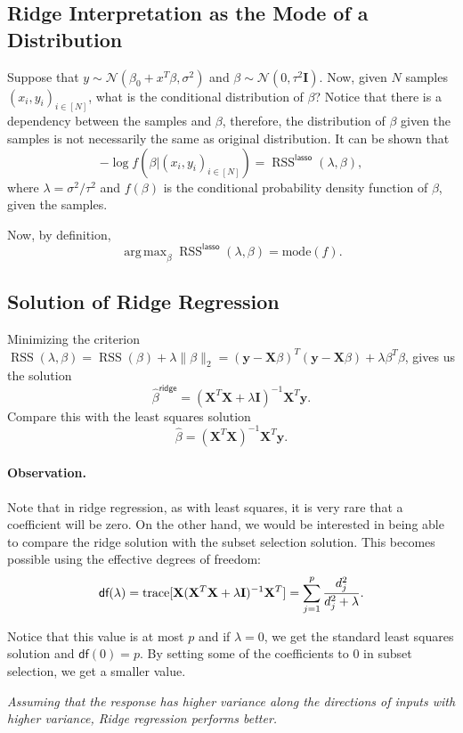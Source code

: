 \documentclass[11pt]{article}
\theoremstyle{definition}
\newcommand{\XX}{\mathbf{X}}
\newcommand{\yy}{\mathbf{y}}
\newcommand{\II}{\mathbf{I}}
\newcommand{\ridge}{\textsf{ridge}}
\newcommand{\lasso}{\textsf{lasso}}
\newcommand{\df}{\textsf{df}}
\newcommand{\Normal}[2]{\ensuremath{\mathcal N (#1, #2)}}
\DeclareMathOperator*{\argmax}{arg\,max}
\DeclareMathOperator*{\RSS}{RSS} \DeclareMathOperator*{\WRSS}{WRSS}
\begin{document}
\subsection{Ridge Interpretation as the Mode of a Distribution}
Suppose that $y\sim \Normal{\beta_0+x^T\beta}{\sigma^2}$ and
$\beta\sim\Normal{0}{\tau^2 \II}$. Now, given $N$ samples $(x_i,y_i)_{i\in[N]}$,
what is the conditional distribution of $\beta$? Notice that there is a
dependency between the samples and $\beta$, therefore, the distribution of
$\beta$ given the samples is not necessarily the same as original distribution.
It can be shown that
\[-\log f(\beta|(x_i,y_i)_{i\in[N]})=\RSS^\lasso(\lambda,\beta),\] where
$\lambda=\sigma^2/\tau^2$ and $f(\beta)$ is the conditional probability density
function of $\beta$, given the samples.

Now, by definition,
\[\argmax_\beta\RSS^\lasso(\lambda,\beta) = \text{mode}(f).\]

\subsection{Solution of Ridge Regression}
Minimizing the criterion $\RSS(\lambda,\beta) = \RSS(\beta) + \lambda\|\beta\|_2
	= (\yy-\XX\beta)^T(\yy-\XX\beta)+\lambda\beta^T\beta$, gives us the solution
\[
	\hat\beta^\ridge = (\XX^T\XX+\lambda \II)^{-1}\XX^T\yy.\]
Compare this with the least squares solution
\[\hat\beta = (\XX^T\XX)^{-1}\XX^T\yy.\]

\paragraph{Observation.} Note that in ridge regression, as with least squares,
it is very rare that a coefficient will be zero. On the other hand, we would be
interested in being able to compare the ridge solution with the subset selection
solution. This becomes possible using the effective degrees of freedom:
\[\df(\lambda)=\tr[\XX(\XX^T\XX+\lambda\II)^{-1}\XX^T]=\sum_{j=1}^p\frac{d_j^2}{d_j^2+\lambda}.\]

Notice that this value is at most $p$ and if $\lambda=0$, we get the standard
least squares solution and $\df(0)=p$. By setting some of the coefficients to 0
in subset selection, we get a smaller value.

\begin{center}
	\emph{Assuming that the response has higher variance along the directions of
		inputs with higher variance, Ridge regression performs better.}
\end{center}
\end{document}
